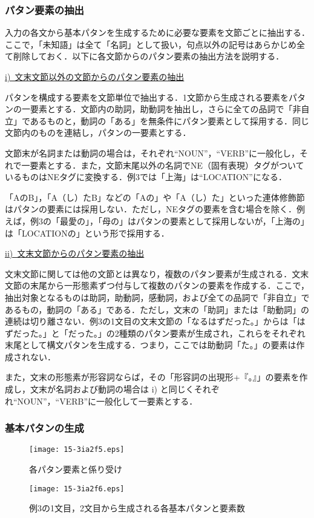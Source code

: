 \documentclass[japanese]{jnlp_1.4}
\begin{document}
\subsubsection{パタン要素の抽出}

入力の各文から基本パタンを生成するために必要な要素を文節ごとに抽出する．ここで，「未知語」は全て「名詞」として扱い，句点以外の記号はあらかじめ全て削除しておく．以下に各文節からのパタン要素の抽出方法を説明する．

\noindent
\ul{\mbox{i) 文末文節以外の文節からのパタン要素の抽出}}

パタンを構成する要素を文節単位で抽出する．1文節から生成される要素をパタンの一要素とする．文節内の助詞，助動詞を抽出し，さらに全ての品詞で「非自立」であるものと，動詞の「ある」を無条件にパタン要素として採用する．同じ文節内のものを連結し，パタンの一要素とする．

文節末が名詞または動詞の場合は，それぞれ``NOUN''，``VERB''に一般化し，それで一要素とする．また，文節末尾以外の名詞でNE（固有表現）タグがついているものはNEタグに変換する．例3では「上海」は``LOCATION''になる．

「AのB」，「A（し）たB」などの「Aの」や「A（し）た」といった連体修飾節はパタンの要素には採用しない．ただし，NEタグの要素を含む場合を除く．例えば，例3の「最愛の」，「母の」はパタンの要素として採用しないが，「上海の」は「LOCATIONの」という形で採用する．

\noindent
\ul{\mbox{ii) 文末文節からのパタン要素の抽出}}

文末文節に関しては他の文節とは異なり，複数のパタン要素が生成される．文末文節の末尾から一形態素ずつ付与して複数のパタンの要素を作成する．ここで，抽出対象となるものは助詞，助動詞，感動詞，および全ての品詞で「非自立」であるもの，動詞の「ある」である．ただし，文末の「助詞」または「助動詞」の連続は切り離さない．例3の1文目の文末文節の「なるはずだった。」からは「はずだった。」と「だった。」の2種類のパタン要素が生成され，これらをそれぞれ末尾として構文パタンを生成する．つまり，ここでは助動詞「た。」の要素は作成されない．

また，文末の形態素が形容詞ならば，その「形容詞の出現形+『。』」の要素を作成し，文末が名詞および動詞の場合は i) と同じくそれぞれ``NOUN''，``VERB''に一般化して一要素とする．

\subsubsection{基本パタンの生成}

\begin{figure}[b]
\centerline{\texttt{[image: 15-3ia2f5.eps]}}
\caption{各パタン要素と係り受け}
\end{figure}
\begin{figure}[b]
\centerline{\texttt{[image: 15-3ia2f6.eps]}}
\caption{例3の1文目，2文目から生成される各基本パタンと要素数}
\end{figure}
\end{document}
